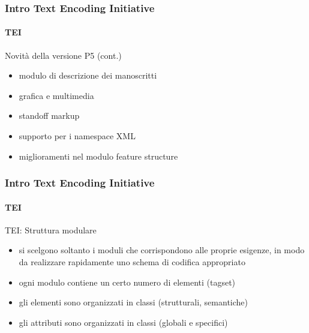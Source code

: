 \begin{frame}
	\frametitle{Intro Text Encoding Initiative}
	\framesubtitle{TEI}
	\addtocounter{nframe}{1}

	\begin{block}{Novità della versione P5 (cont.)}
		\begin{itemize}
			\item modulo di descrizione dei manoscritti
			\item grafica e multimedia
			\item standoff markup
			\item supporto per i namespace XML
			\item miglioramenti nel modulo feature structure
		\end{itemize}

	\end{block}

\end{frame}

\begin{frame}
	\frametitle{Intro Text Encoding Initiative}
	\framesubtitle{TEI}
	\addtocounter{nframe}{1}

	\begin{block}{TEI: Struttura modulare}
		\begin{itemize}
			\item si scelgono soltanto i moduli che corrispondono alle proprie esigenze, in modo da realizzare rapidamente uno schema di codifica appropriato
			\item ogni modulo contiene un certo numero di elementi (tagset)
			\item gli elementi sono organizzati in classi (strutturali, semantiche)
			\item gli attributi sono organizzati in classi (globali e specifici)
		\end{itemize}

	\end{block}

\end{frame}




